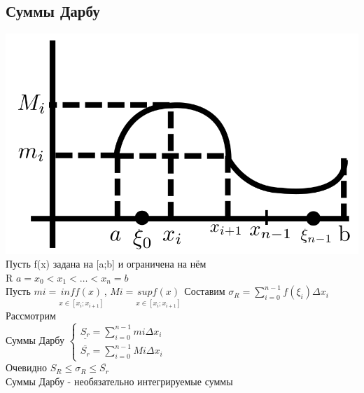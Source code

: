 \documentclass[12pt]{article}
\let\ORIincludegraphics\includegraphics
\renewcommand{\includegraphics}[2][]{\ORIincludegraphics[scale=0.65,#1]{#2}}
\begin{document}
    \subsection{Суммы Дарбу}
    \includegraphics[width=0.8\linewidth]{6.4.1.png}\\
    Пусть f(x) задана на [a;b] и ограничена на нём\\
    R $a=x_0<x_1<\dots<x_n=b$\\
    Пусть $mi = \underset{x \in [x_i;x_{i+1}]}{inf f(x)}$, $Mi = \underset{x \in [x_i;x_{i+1}]}{sup f(x)}$
    Составим $\sigma_R = \sum_{i=0}^{n-1} f(\xi_i) \Delta x_i$\\
    Рассмотрим\\
    Суммы Дарбу $\begin{cases}
        \underline{S_r} = \sum_{i=0}^{n-1} mi \Delta x_i\\
        \overline{S_r} = \sum_{i=0}^{n-1} Mi \Delta x_i
    \end{cases}$\\
    Очевидно \underline{$S_R$}$\leq \sigma_R \leq \overline{S_r}$\\
    Суммы Дарбу - необязательно интегрируемые суммы\\
\end{document}
